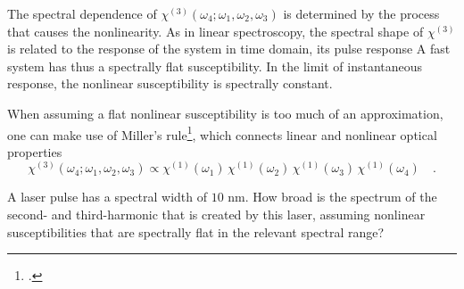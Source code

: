 The spectral dependence of $\chi^{(3)}(\omega_4; \omega_1, \omega_2, \omega_3)$ is determined by the process that causes the nonlinearity. As in linear spectroscopy, the spectral shape of  $\chi^{(3)}$ is related to the response of the system in time domain, its pulse response A fast system has thus a spectrally flat susceptibility. In the limit of instantaneous response, the nonlinear susceptibility is spectrally constant.
		
When assuming a flat nonlinear susceptibility is too much of an approximation, one can make use of Miller's rule\footcite{Boyd2008,Miller64,Obermeier18}, which connects linear and nonlinear optical properties
\begin{equation}
  \chi^{(3)}(\omega_4; \omega_1, \omega_2, \omega_3) \propto  \chi^{(1)}(\omega_1) \,   \chi^{(1)}(\omega_2)  \,   \chi^{(1)}(\omega_3)  \,   \chi^{(1)}(\omega_4)  \quad .
 \end{equation}
 		
\begin{questions}
\item A laser pulse has a spectral width of $10$ nm. How broad is the spectrum of the second- and third-harmonic that is created by this laser, assuming nonlinear susceptibilities that are spectrally flat in the relevant spectral range?
\end{questions}
 
\printbibliography[segment=\therefsegment,heading=subbibliography]

